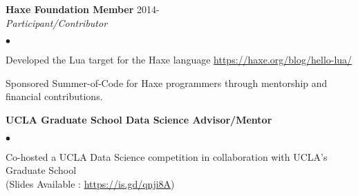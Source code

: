 \documentclass[margin,line]{res}
\newenvironment{list2}{
  \begin{list}{$\bullet$}{%
      \setlength{\itemsep}{0in}
      \setlength{\parsep}{0in} \setlength{\parskip}{0in}
      \setlength{\topsep}{0in} \setlength{\partopsep}{0in} 
      \setlength{\leftmargin}{0.2in}}}{\end{list}}
\begin{document}
\begin{resume}
{\bf Haxe Foundation Member} \hfill 2014- \\
{\em Participant/Contributor} 

\begin{list2}
  \item Developed the Lua target for the Haxe language \url{https://haxe.org/blog/hello-lua/}
  \item Sponsored Summer-of-Code for Haxe programmers through mentorship and financial contributions.
\end{list2}


{\bf UCLA Graduate School Data Science Advisor/Mentor}
\begin{list2}
  \item Co-hosted a UCLA Data Science competition in collaboration with UCLA's Graduate School \\ (Slides Available : \url{https://is.gd/qnji8A})
\end{list2}






%

\end{resume}
\end{document}
